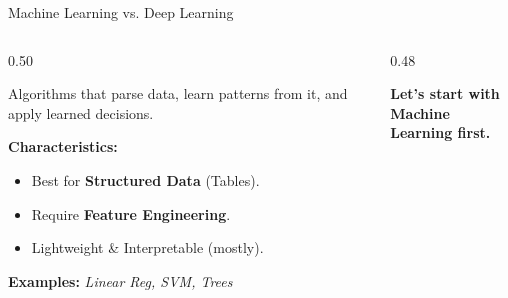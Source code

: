 \begin{frame}{Machine Learning vs. Deep Learning}
    \centering
    \begin{columns}[T]
        \begin{column}{0.50\textwidth}
            \begin{tcolorbox}[colback=green!5, title=\textbf{1. Machine Learning (ML)}]
                Algorithms that parse data, learn patterns from it, and apply learned decisions.
            \end{tcolorbox}
            
            \vspace{0.5em}
            \textbf{Characteristics:}
            \begin{itemize}
                \item Best for \textbf{Structured Data} (Tables).
                \item Require \textbf{Feature Engineering}.
                \item Lightweight \& Interpretable (mostly).
            \end{itemize}
            
            \vspace{0.5em}
            \centering
            \textbf{Examples:}
            \footnotesize \textit{Linear Reg, SVM, Trees}
        \end{column}

        \begin{column}{0.48\textwidth}
            \vspace{1.5cm} %
            \centering
            \begin{tcolorbox}[colback=green!5, colframe=green!50, width=0.9\linewidth, arc=10pt]
                \centering
                \large
                \textbf{Let's start with \\ Machine Learning first.}
            \end{tcolorbox}
        \end{column}
    \end{columns}
\end{frame}



